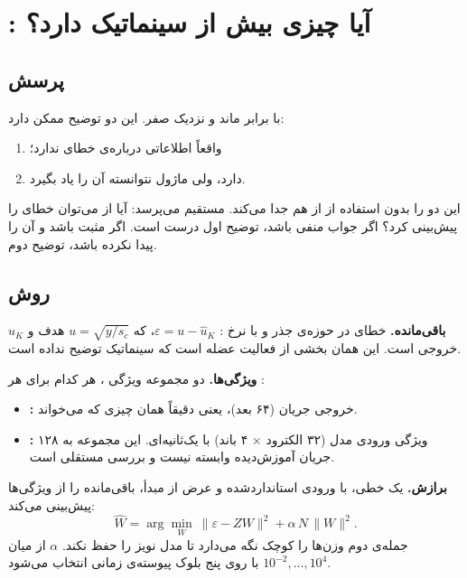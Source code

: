 \FloatBarrier
\section{: آیا  چیزی بیش از سینماتیک دارد؟}
\label{sec:residual}

\subsection{پرسش}

 با  برابر ماند و  نزدیک صفر. این دو توضیح ممکن دارد:
\begin{enumerate}
\item {} واقعاً اطلاعاتی درباره‌ی خطای  ندارد؛
\item دارد، ولی ماژول  نتوانسته آن را یاد بگیرد.
\end{enumerate}
 این دو را بدون استفاده از  از هم جدا می‌کند. مستقیم می‌پرسد: آیا از  می‌توان خطای  را پیش‌بینی کرد؟ اگر جواب منفی باشد، توضیح اول درست است. اگر مثبت باشد و  آن را پیدا نکرده باشد، توضیح دوم.

\subsection{روش}

\textbf{باقی‌مانده.} خطای  در حوزه‌ی جذر و با نرخ : $\varepsilon=u-\hat u_K$، که $u=\sqrt{y/s_c}$ هدف و $\hat u_K$ خروجی  است. این همان بخشی از فعالیت عضله است که سینماتیک توضیح نداده است.

\textbf{ویژگی‌ها.} دو مجموعه ویژگی ، هر کدام برای هر :
\begin{itemize}
\item \textbf{:} خروجی  جریان  (۶۴ بعد)، یعنی دقیقاً همان چیزی که  می‌خواند.
\item \textbf{:} ۱۲۸ ویژگی ورودی مدل (۳۲ الکترود × ۴ باند) با  یک‌ثانیه‌ای. این مجموعه به جریان  آموزش‌دیده وابسته نیست و بررسی مستقلی است.
\end{itemize}

\textbf{برازش.} یک  خطی، با ورودی استانداردشده و عرض از مبدأ، باقی‌مانده را از ویژگی‌ها پیش‌بینی می‌کند:
\begin{equation}
\hat W=\arg\min_W\ \|\varepsilon-ZW\|^2+\alpha\,N\,\|W\|^2.
\end{equation}
جمله‌ی دوم وزن‌ها را کوچک نگه می‌دارد تا مدل نویز را حفظ نکند. $\alpha$ از میان $10^{-2},\dots,10^{4}$ با  روی پنج بلوک پیوسته‌ی زمانی انتخاب می‌شود.

